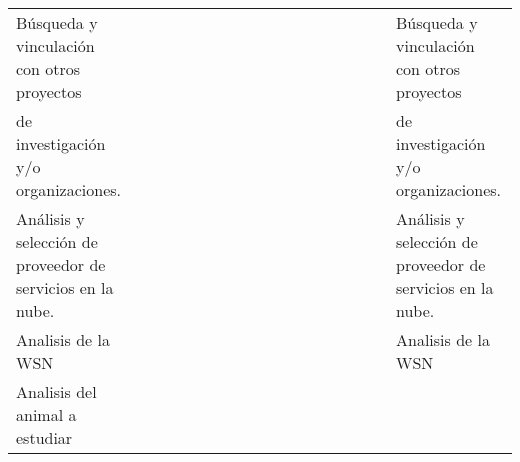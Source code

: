 \begin{table}[H]
{\begin{tabular}{|l|llllllllllllllll|l|}
Búsqueda y vinculación con otros proyectos &
  \multicolumn{1}{l|}{} &
  \multicolumn{1}{l|}{} &
  \multicolumn{1}{l|}{\cellcolor[HTML]{F4B084}} &
  \multicolumn{1}{l|}{\cellcolor[HTML]{F4B084}} &
  \multicolumn{1}{l|}{\cellcolor[HTML]{F4B084}} &
  \multicolumn{1}{l|}{\cellcolor[HTML]{F4B084}} &
  \multicolumn{1}{l|}{\cellcolor[HTML]{F4B084}} &
  \multicolumn{1}{l|}{\cellcolor[HTML]{F4B084}} &
  \multicolumn{1}{l|}{} &
  \multicolumn{1}{l|}{} &
  \multicolumn{1}{l|}{} &
  \multicolumn{1}{l|}{} &
  \multicolumn{1}{l|}{} &
  \multicolumn{1}{l|}{} &
  \multicolumn{1}{l|}{} &
   &
  Búsqueda y vinculación con otros proyectos \\
de investigación y/o organizaciones. &
  \multicolumn{1}{l|}{} &
  \multicolumn{1}{l|}{} &
  \multicolumn{1}{l|}{\cellcolor[HTML]{F4B084}} &
  \multicolumn{1}{l|}{\cellcolor[HTML]{F4B084}} &
  \multicolumn{1}{l|}{\cellcolor[HTML]{F4B084}} &
  \multicolumn{1}{l|}{\cellcolor[HTML]{F4B084}} &
  \multicolumn{1}{l|}{\cellcolor[HTML]{F4B084}} &
  \multicolumn{1}{l|}{\cellcolor[HTML]{F4B084}} &
  \multicolumn{1}{l|}{} &
  \multicolumn{1}{l|}{} &
  \multicolumn{1}{l|}{} &
  \multicolumn{1}{l|}{} &
  \multicolumn{1}{l|}{} &
  \multicolumn{1}{l|}{} &
  \multicolumn{1}{l|}{} &
   &
  de investigación y/o organizaciones. \\ \hline
Análisis y selección de proveedor de servicios en la nube. &
  \multicolumn{1}{l|}{} &
  \multicolumn{1}{l|}{} &
  \multicolumn{1}{l|}{\cellcolor[HTML]{BDD7EE}} &
  \multicolumn{1}{l|}{\cellcolor[HTML]{BDD7EE}} &
  \multicolumn{1}{l|}{\cellcolor[HTML]{BDD7EE}} &
  \multicolumn{1}{l|}{\cellcolor[HTML]{BDD7EE}} &
  \multicolumn{1}{l|}{} &
  \multicolumn{1}{l|}{} &
  \multicolumn{1}{l|}{} &
  \multicolumn{1}{l|}{} &
  \multicolumn{1}{l|}{} &
  \multicolumn{1}{l|}{} &
  \multicolumn{1}{l|}{} &
  \multicolumn{1}{l|}{} &
  \multicolumn{1}{l|}{} &
   &
  Análisis y selección de proveedor de servicios en la nube. \\ \hline
Analisis de la WSN &
  \multicolumn{1}{l|}{} &
  \multicolumn{1}{l|}{} &
  \multicolumn{1}{l|}{} &
  \multicolumn{1}{l|}{\cellcolor[HTML]{FFFF00}} &
  \multicolumn{1}{l|}{\cellcolor[HTML]{FFFF00}} &
  \multicolumn{1}{l|}{\cellcolor[HTML]{FFFF00}} &
  \multicolumn{1}{l|}{\cellcolor[HTML]{FFFF00}} &
  \multicolumn{1}{l|}{} &
  \multicolumn{1}{l|}{} &
  \multicolumn{1}{l|}{} &
  \multicolumn{1}{l|}{} &
  \multicolumn{1}{l|}{} &
  \multicolumn{1}{l|}{} &
  \multicolumn{1}{l|}{} &
  \multicolumn{1}{l|}{} &
   &
  Analisis de la WSN \\ \hline
Analisis del animal a estudiar &

\end{tabular}}
\end{table}

